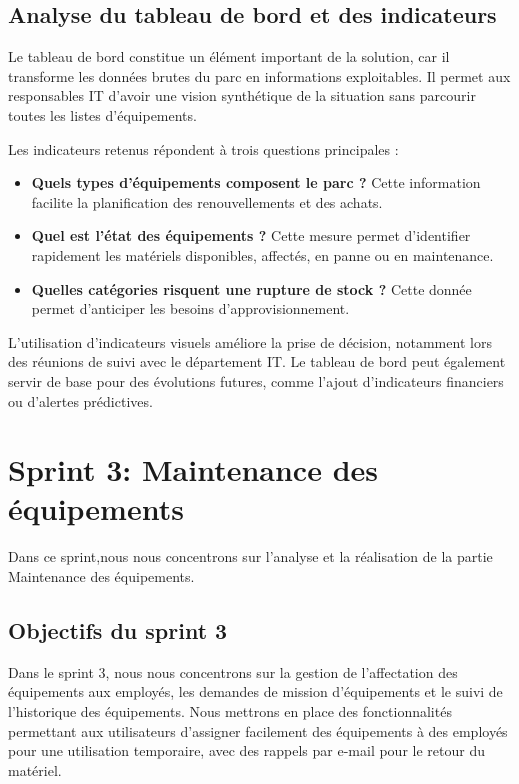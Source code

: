 \subsection{Analyse du tableau de bord et des indicateurs}

Le tableau de bord constitue un élément important de la solution, car il transforme les données brutes du parc en informations exploitables. Il permet aux responsables IT d'avoir une vision synthétique de la situation sans parcourir toutes les listes d'équipements.

Les indicateurs retenus répondent à trois questions principales :

\begin{itemize}[label=\textbullet,font=\normalsize]
    \item \textbf{Quels types d'équipements composent le parc ?} Cette information facilite la planification des renouvellements et des achats.
    \item \textbf{Quel est l'état des équipements ?} Cette mesure permet d'identifier rapidement les matériels disponibles, affectés, en panne ou en maintenance.
    \item \textbf{Quelles catégories risquent une rupture de stock ?} Cette donnée permet d'anticiper les besoins d'approvisionnement.
\end{itemize}

L'utilisation d'indicateurs visuels améliore la prise de décision, notamment lors des réunions de suivi avec le département IT. Le tableau de bord peut également servir de base pour des évolutions futures, comme l'ajout d'indicateurs financiers ou d'alertes prédictives.
    
\section{Sprint 3: Maintenance des équipements}

Dans ce sprint,nous nous concentrons sur l’analyse et la réalisation de la partie Maintenance des équipements. 

    \subsection{Objectifs du sprint 3}
    
Dans le sprint 3, nous nous concentrons sur la gestion de l'affectation des équipements aux employés, les demandes de mission d'équipements et le suivi de l'historique des équipements. Nous mettrons en place des fonctionnalités permettant aux utilisateurs d'assigner facilement des équipements à des employés pour une utilisation temporaire, avec des rappels par e-mail pour le retour du matériel. 


